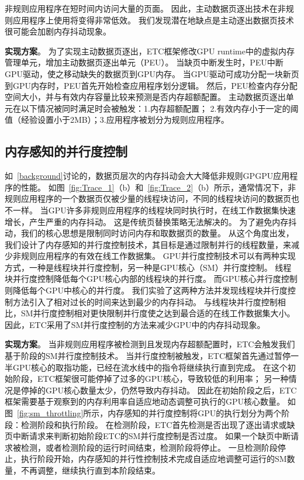 非规则应用程序在短时间内访问大量的页面。
因此，主动数据页逐出技术在非规则应用程序上使用将变得非常低效。
我们发现潜在地缺点是主动逐出数据页技术很可能会加剧内存抖动现象。

\textbf{实现方案}。
为了实现主动数据页逐出，ETC框架修改GPU runtime中的虚拟内存管理单元，增加主动数据页逐出单元（PEU）。
当缺页中断发生时，PEU中断GPU驱动，使之移动缺失的数据页到GPU内存。
当GPU驱动可成功分配一块新页到GPU内存时，PEU首先开始检查应用程序划分逻辑。
然后，PEU检查内存分配空间大小，并与有效内存容量比较来预测是否内存超额配置。
主动数据页逐出单元在以下情况被同时满足时会被触发：1.内存超额配置； 2.有效内存小于一定的阈值（经验设置小于2MB）；3.应用程序被划分为规则应用程序。


\subsection{内存感知的并行度控制}

如~\ref{background}讨论的，数据页层次的内存抖动会大大降低非规则GPGPU应用程序的性能。
如图~\ref{fig:Trace_1}（b）和~\ref{fig:Trace_2}（b）所示，通常情况下，非规则应用程序的一个数据页仅被少量的线程块访问，不同的线程块访问的数据页也不一样。
当GPU许多非规则应用程序的线程块同时执行时，在线工作数据集快速增长，产生严重的内存抖动。
这是传统页替换策略无法解决的。
为了避免内存抖动，我们的核心思想是限制同时访问内存和取数据页的数量。
从这个角度出发，我们设计了内存感知的并行度控制技术，其目标是通过限制并行的线程数量，来减少非规则应用程序的有效在线工作数据集。
GPU并行度控制技术可以有两种实现方式，一种是线程块并行度控制，另一种是GPU核心（SM）并行度控制。
线程块并行度控制降低每个GPU核心内部的线程块的并行度。
而GPU核心并行度控制则降低每个GPU中核心的并行度。
我们实验了这两种方法并发现线程块并行度控制方法引入了相对过长的时间来达到最少的内存抖动。
与线程块并行度控制相比，SM并行度控制相对更快限制并行度使之达到最合适的在线工作数据集大小。
因此，ETC采用了SM并行度控制的方法来减少GPU中的内存抖动现象。

\textbf{实现方案}。
当非规则应用程序被检测到且发现内存超额配置时，ETC会触发我们基于阶段的SM并行度控制技术。
当并行度控制被触发，ETC框架首先通过暂停一半GPU核心的取指功能，已经在流水线中的指令将继续执行直到完成。
在这个初始阶段，ETC框架很可能停掉了过多的GPU核心，导致较低的利用率；
另一种情况是停掉的GPU核心数量太少，仍然导致内存抖动。
因此在初始阶段之后，ETC框架需要基于观察到的内存利用率自适应地动态调整可执行的GPU核心数量。
如图~\ref{fig:sm_throttling}所示，内存感知的并行度控制将GPU的执行划分为两个阶段：检测阶段和执行阶段。
在检测阶段，ETC首先检测是否出现了逐出请求或缺页中断请求来判断初始阶段ETC的SM并行度控制是否过度。
如果一个缺页中断请求被检测，或者检测阶段的运行时间结束，检测阶段将停止。
一旦检测阶段停止，执行阶段开始，内存感知的并行性控制技术完成自适应地调整可运行的SM数量，不再调整，继续执行直到本阶段结束。

